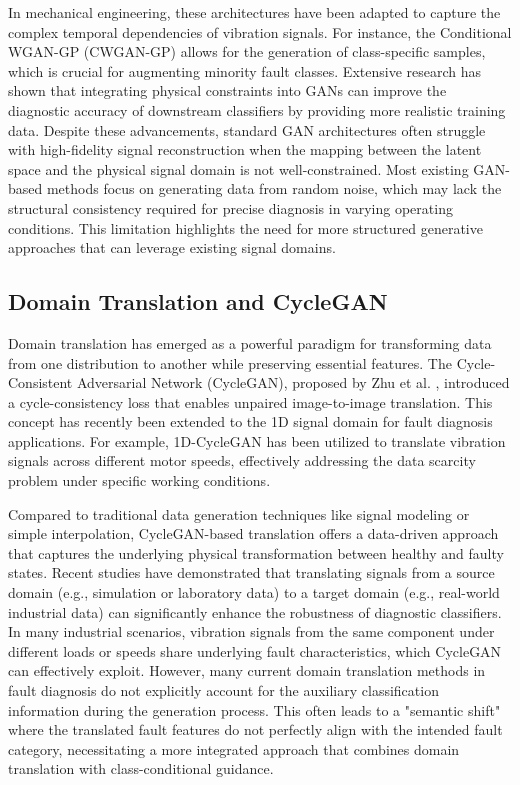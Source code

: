 \documentclass[twocolumn]{IEEEtran}
\begin{document}
In mechanical engineering, these architectures have been adapted to capture the complex temporal dependencies of vibration signals. For instance, the Conditional WGAN-GP (CWGAN-GP) \cite{7} allows for the generation of class-specific samples, which is crucial for augmenting minority fault classes. Extensive research has shown that integrating physical constraints into GANs can improve the diagnostic accuracy of downstream classifiers by providing more realistic training data. Despite these advancements, standard GAN architectures often struggle with high-fidelity signal reconstruction when the mapping between the latent space and the physical signal domain is not well-constrained. Most existing GAN-based methods focus on generating data from random noise, which may lack the structural consistency required for precise diagnosis in varying operating conditions. This limitation highlights the need for more structured generative approaches that can leverage existing signal domains.

\subsection{Domain Translation and CycleGAN}
Domain translation has emerged as a powerful paradigm for transforming data from one distribution to another while preserving essential features. The Cycle-Consistent Adversarial Network (CycleGAN), proposed by Zhu et al. \cite{4}, introduced a cycle-consistency loss that enables unpaired image-to-image translation. This concept has recently been extended to the 1D signal domain for fault diagnosis applications. For example, 1D-CycleGAN \cite{37} has been utilized to translate vibration signals across different motor speeds, effectively addressing the data scarcity problem under specific working conditions.

Compared to traditional data generation techniques like signal modeling or simple interpolation, CycleGAN-based translation \cite{36} offers a data-driven approach that captures the underlying physical transformation between healthy and faulty states. Recent studies \cite{36} have demonstrated that translating signals from a source domain (e.g., simulation or laboratory data) to a target domain (e.g., real-world industrial data) can significantly enhance the robustness of diagnostic classifiers. In many industrial scenarios, vibration signals from the same component under different loads or speeds share underlying fault characteristics, which CycleGAN can effectively exploit. However, many current domain translation methods in fault diagnosis do not explicitly account for the auxiliary classification information during the generation process. This often leads to a "semantic shift" where the translated fault features do not perfectly align with the intended fault category, necessitating a more integrated approach that combines domain translation with class-conditional guidance.
\end{document}
